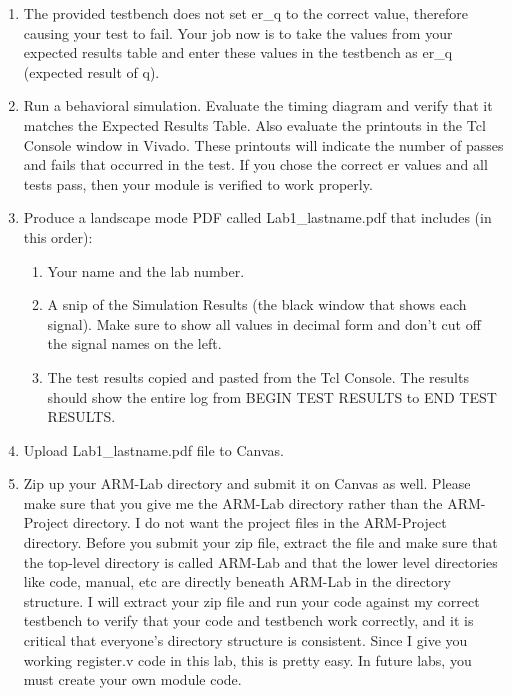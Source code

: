 \begin{enumerate}
\item The provided testbench does not set er\_q to the correct value, therefore causing your test to fail.  Your job now is to take the values from your expected results table and enter these values in the testbench as er\_q (expected result of q).
\item Run a behavioral simulation.  Evaluate the timing diagram and verify that it matches the Expected Results Table.  Also evaluate the printouts in the Tcl Console window in Vivado.  These printouts will indicate the number of passes and fails that occurred in the test.  If you chose the correct er values and all tests pass, then your module is verified to work properly.   
\item Produce a landscape mode PDF called Lab1\_lastname.pdf that includes (in this order):
	\begin{enumerate}
		\item Your name and the lab number.
		\item A snip of the Simulation Results (the black window that shows each signal).  Make sure to show all values in decimal form and don't cut off the signal names on the left.  
		\item The test results copied and pasted from the Tcl Console.  The results should show the entire log from BEGIN TEST RESULTS to END TEST RESULTS.
	\end{enumerate}
\item Upload Lab1\_lastname.pdf file to Canvas.
\item Zip up your ARM-Lab directory and submit it on Canvas as well.  Please make sure that you give me the ARM-Lab directory rather than the ARM-Project directory.  I do not want the project files in the ARM-Project directory.  Before you submit your zip file, extract the file and make sure that the top-level directory is called ARM-Lab and that the lower level directories like code, manual, etc are directly beneath ARM-Lab in the directory structure.  I will extract your zip file and run your code against my correct testbench to verify that your code and testbench work correctly, and it is critical that everyone's directory structure is consistent.  Since I give you working register.v code in this lab, this is pretty easy.  In future labs, you must create your own module code.
\end{enumerate} 
